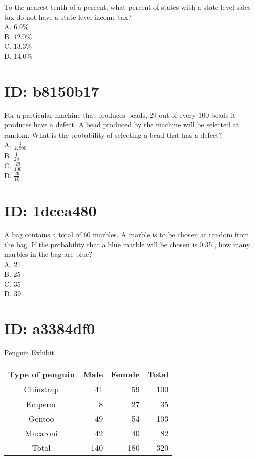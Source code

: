To the nearest tenth of a percent, what percent of states with a state-level sales tax do not have a state-level income tax?\\
A. $6.0 \%$\\
B. $12.0 \%$\\
C. $13.3 \%$\\
D. $14.0 \%$

\section*{ID: b8150b17}
For a particular machine that produces beads, 29 out of every 100 beads it produces have a defect. A bead produced by the machine will be selected at random. What is the probability of selecting a bead that has a defect?\\
A. $\frac{1}{2,900}$\\
B. $\frac{1}{29}$\\
C. $\frac{29}{100}$\\
D. $\frac{29}{10}$

\section*{ID: 1dcea480}
A bag contains a total of 60 marbles. A marble is to be chosen at random from the bag. If the probability that a blue marble will be chosen is 0.35 , how many marbles in the bag are blue?\\
A. 21\\
B. 25\\
C. 35\\
D. 39

\section*{ID: a3384df0}
Penguin Exhibit

\begin{center}
\begin{tabular}{|c|r|r|r|}
\hline\hline
Type of penguin & Male & Female & Total \\
\hline
Chinstrap & 41 & 59 & 100 \\
\hline
Emperor & 8 & 27 & 35 \\
\hline
Gentoo & 49 & 54 & 103 \\
\hline
Macaroni & 42 & 40 & 82 \\
\hline
Total & 140 & 180 & 320 \\
\hline
\end{tabular}
\end{center}


